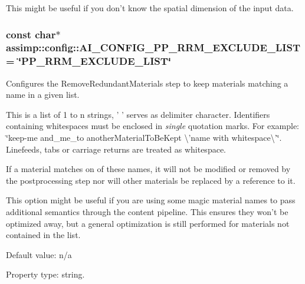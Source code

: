 This might be useful if you don't know the spatial dimension of the input data. \hypertarget{namespaceassimp_1_1config_a3d8aaf7baf4a885d78aa8f03df9227ea}{
\subsubsection[{A\+I\+\_\+\+C\+O\+N\+F\+I\+G\+\_\+\+P\+P\+\_\+\+R\+R\+M\+\_\+\+E\+X\+C\+L\+U\+D\+E\+\_\+\+L\+I\+S\+T}]{\setlength{\rightskip}{0pt plus 5cm}const char$\ast$ assimp\+::config\+::\+A\+I\+\_\+\+C\+O\+N\+F\+I\+G\+\_\+\+P\+P\+\_\+\+R\+R\+M\+\_\+\+E\+X\+C\+L\+U\+D\+E\+\_\+\+L\+I\+S\+T = \char`\"{}P\+P\+\_\+\+R\+R\+M\+\_\+\+E\+X\+C\+L\+U\+D\+E\+\_\+\+L\+I\+S\+T\char`\"{}}}\label{namespaceassimp_1_1config_a3d8aaf7baf4a885d78aa8f03df9227ea}
Configures the {\ttfamily Remove\+Redundant\+Materials} step to keep materials matching a name in a given list.

This is a list of 1 to n strings, ' ' serves as delimiter character. Identifiers containing whitespaces must be enclosed in {\itshape single} quotation marks. For example\+: {\ttfamily  \char`\"{}keep-\/me and\+\_\+me\+\_\+to another\+Material\+To\+Be\+Kept \textbackslash{}'name with whitespace\textbackslash{}'\char`\"{}}. Linefeeds, tabs or carriage returns are treated as whitespace.

If a material matches on of these names, it will not be modified or removed by the postprocessing step nor will other materials be replaced by a reference to it.

This option might be useful if you are using some magic material names to pass additional semantics through the content pipeline. This ensures they won't be optimized away, but a general optimization is still performed for materials not contained in the list.

Default value\+: n/a

Property type\+: string.

